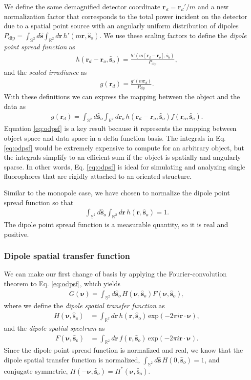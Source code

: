 \documentclass[]{osa-article}
\providecommand{\mb}[1]{\mathbf{#1}}
\providecommand{\ro}{\mathbf{\mathbf{r}}_o}
\providecommand{\so}{\mathbf{\hat{s}}_o}
\providecommand{\rd}{\mathbf{r}_d}
\providecommand{\mh}[1]{\mathbf{\hat{#1}}}
\providecommand{\mbb}[1]{\mathbb{#1}}
\providecommand{\bs}[1]{\boldsymbol{#1}}
\providecommand{\bv}{\bs{\nu}}
\begin{document}
We define the same demagnified detector coordinate $\rd = \rd'/m$ and a new
normalization factor that corresponds to the total power incident on the
detector due to a spatial point source with an angularly uniform distribution of
dipoles
$P_\text{dip} = \int_{\mbb{S}^2}d\mh{s}\int_{\mbb{R}^2}d\mb{r}\, h'(m\mb{r},
\so)$. We use these scaling factors to define the
\textit{dipole point spread function} as
\begin{align}
  h(\rd - \ro, \so) = \frac{h'(m[\rd - \ro], \so)}{P_\text{dip}}, 
\end{align}
and the \textit{scaled irradiance} as 
\begin{align}
  g(\rd) = \frac{g'(m\rd)}{P_\text{dip}}. 
\end{align}
With these definitions we can express the mapping between the object and the
data as
\begin{align}
g(\rd{}) = \int_{\mbb{S}^2}d\so{}\int_{\mbb{R}^2}d\ro{}\, h(\rd{} -\ro{}, \so{})f(\ro, \so). \label{eq:odpsf}
\end{align}
Equation \eqref{eq:odpsf} is a key result because it represents the mapping
between object space and data space in a delta function basis. The integrals in
Eq. \eqref{eq:odpsf} would be extremely expensive to compute for an arbitrary
object, but the integrals simplify to an efficient sum if the object is
spatially and angularly sparse. In other words, Eq. \eqref{eq:odpsf} is ideal for
simulating and analyzing single fluorophores that are rigidly attached to an
oriented structure.

Similar to the monopole case, we have chosen to normalize the dipole point
spread function so that
\begin{align}
  \int_{\mbb{S}^2}d\so\int_{\mbb{R}^2}d\mb{r}\, h(\mb{r}, \so) = 1. 
\end{align}
The dipole point spread function is a measurable quantity, so it is real
and positive.

\subsubsection{Dipole spatial transfer function}
We can make our first change of basis by applying the Fourier-convolution
theorem to Eq. \eqref{eq:odpsf}, which yields
\begin{align}
G(\bv) = \int_{\mbb{S}^2}d\so\, H(\bv, \so)F(\bv, \so) \label{eq:odotf},
\end{align}
where we define the \textit{dipole spatial transfer function} as
  \begin{align}
  H(\bv, \so) &= \int_{\mbb{R}^2}d\mb{r}\, h(\mb{r}, \so)\, \text{exp}(-2\pi i\mb{r}\cdot\bv),\label{eq:dstf}
  \end{align}
  and the \textit{dipole spatial spectrum} as
  \begin{align}
  F(\bv, \so) &= \int_{\mbb{R}^2}d\mb{r}\, f(\mb{r}, \so)\, \text{exp}(-2\pi i\mb{r}\cdot\bv). 
  \end{align}
  Since the dipole point spread function is normalized and real, we know that
  the dipole spatial transfer function is normalized,
  $\int_{\mbb{S}^2}d\mh{s}\, H(0, \so) = 1$, and conjugate symmetric,
  $H(-\bv, \so) = H^*(\bv, \so)$.
  
\end{document}
